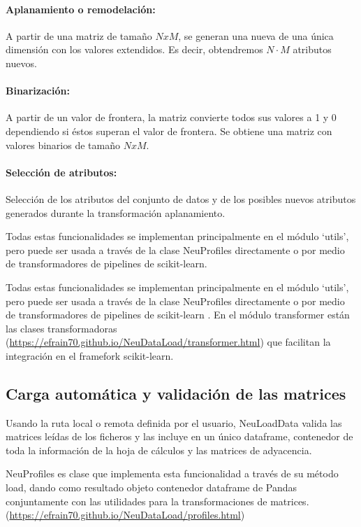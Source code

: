 \paragraph{Aplanamiento o remodelación:}
A partir de una matriz de tamaño $NxM$, se generan una nueva de una única dimensión con los valores extendidos. Es decir, obtendremos $N·M$ atributos nuevos.

\paragraph{Binarización:} A partir de un valor de frontera, la matriz convierte todos sus valores a 1 y 0 dependiendo si éstos superan el valor de frontera. Se obtiene una matriz con valores binarios de tamaño $NxM$.

\paragraph{Selección de atributos:} Selección de los atributos del conjunto de datos y de los posibles nuevos atributos generados durante la transformación aplanamiento. 

Todas estas funcionalidades se implementan principalmente en el módulo ‘utils’, pero puede ser usada a través de la clase NeuProfiles directamente o por medio de transformadores de pipelines de scikit-learn.



Todas estas funcionalidades se implementan principalmente en el módulo ‘utils’, pero puede ser usada a través de la clase NeuProfiles directamente o por medio de transformadores de pipelines de scikit-learn \cite{Scikit-learn:Documentation}. En el módulo transformer están las clases transformadoras (\url{https://efrain70.github.io/NeuDataLoad/transformer.html}) que facilitan la integración en el framefork scikit-learn.

\subsection{Carga automática y validación de las matrices}
Usando la ruta local o remota definida por el usuario, NeuLoadData valida las matrices leídas de los ficheros y las incluye en un único dataframe, contenedor de toda la información de la hoja de cálculos y las matrices de adyacencia.

NeuProfiles es clase que implementa esta funcionalidad a través de su método load, dando como resultado objeto contenedor dataframe de Pandas \cite{PythonLibrary} conjuntamente con las utilidades para la transformaciones de matrices. (\url{https://efrain70.github.io/NeuDataLoad/profiles.html})

